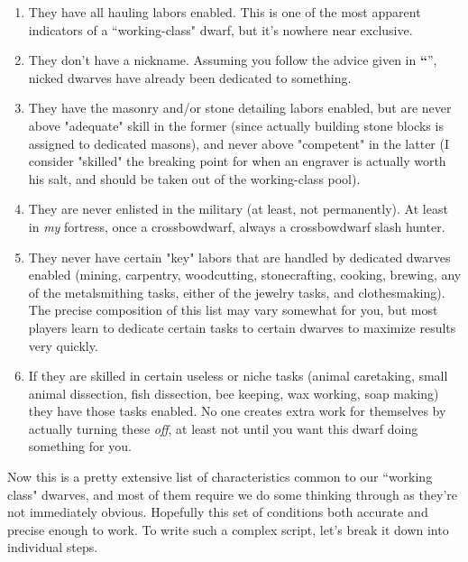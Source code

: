 \documentclass[]{article}
\newcommand{\jump}[1] {\textbf{``\nameref{sec:#1}}''}
\begin{document}
\begin{enumerate}
\item They have all hauling labors enabled. This is one of the most apparent indicators of a
``working-class" dwarf, but it's nowhere near exclusive.

\item They don't have a nickname. Assuming you follow the advice given in
\jump{Assigning Nicknames}, nicked dwarves have already been dedicated to something.

\item They have the masonry and/or stone detailing labors enabled, but are never above "adequate" skill
in the former (since actually building stone blocks is assigned to dedicated masons), and never above
"competent" in the latter (I consider "skilled" the breaking point for when an engraver is actually worth
his salt, and should be taken out of the working-class pool).

\item They are never enlisted in the military (at least, not permanently). At least in \emph{my}
fortress, once a crossbowdwarf, always a crossbowdwarf slash hunter.

\item They never have certain "key" labors that are handled by dedicated dwarves enabled (mining,
carpentry, woodcutting, stonecrafting, cooking, brewing, any of the metalsmithing tasks, either of the
jewelry tasks, and clothesmaking). The precise composition of this list may vary somewhat for you, but
most players learn to dedicate certain tasks to certain dwarves to maximize results very quickly.

\item If they are skilled in certain useless or niche tasks (animal caretaking, small animal dissection,
fish dissection, bee keeping, wax working, soap making) they have those tasks enabled. No one creates
extra work for themselves by actually turning these \emph{off}, at least not until you want this dwarf
doing something for you.

\end{enumerate}

Now this is a pretty extensive list of characteristics common to our ``working class" dwarves, and most
of them require we do some thinking through as they're not immediately obvious.
Hopefully this set of conditions both accurate and precise enough to work. To write such a complex
script, let's break it down into individual steps.
\vspace{12pt}
\end{document}
